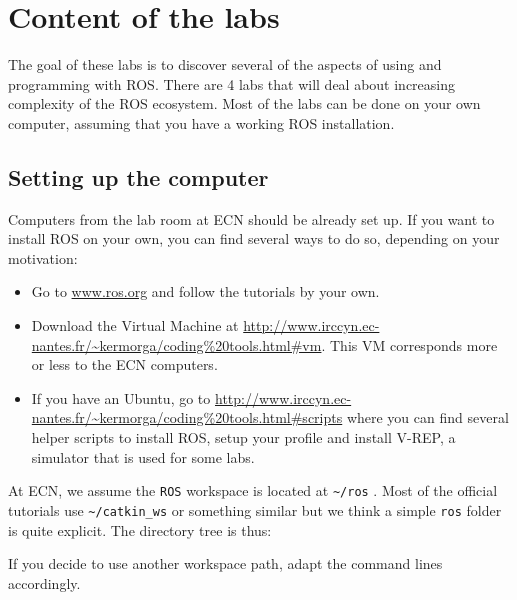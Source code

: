 \documentclass{ecnreport}
\author{G. Garcia, O. Kermorgant}
\newcommand{\ttt}[1]
{
{\tt{#1}}
}
\begin{document}

\section*{Content of the labs}

The goal of these labs is to discover several of the aspects of using and programming with ROS. 
There are 4 labs that will deal about increasing complexity of the ROS ecosystem. Most of the labs can be done on your 
own computer, assuming that you have a working ROS installation. 

\subsection*{Setting up the computer}

Computers from the lab room at ECN should be already set up. If you want to install ROS on your own,
you can find several ways to do so, depending on your motivation:
\begin{itemize}
 \item Go to \url{www.ros.org} and follow the tutorials by your own.
 \item Download the Virtual Machine at \url{http://www.irccyn.ec-nantes.fr/\~kermorga/coding\%20tools.html\#vm}. This VM corresponds
 more or less to the ECN computers. 
 \item If you have an Ubuntu, go to \url{http://www.irccyn.ec-nantes.fr/\~kermorga/coding%20tools.html\#scripts} where you 
 can find several helper scripts to install ROS, setup your profile and install V-REP, a simulator
 that is used for some labs. 
\end{itemize}

At ECN, we assume the \ttt{ROS} workspace is located at \ttt{\textasciitilde/ros}. Most of the official tutorials use \ttt{\textasciitilde/catkin\_ws} or something similar
but we think a simple \ttt{ros} folder is quite explicit. 
The directory tree is thus:
\begin{center}\begin{minipage}{.4\linewidth}
  \end{minipage}
\end{center}

If you decide to use another workspace path, adapt the command lines accordingly.
\end{document}
